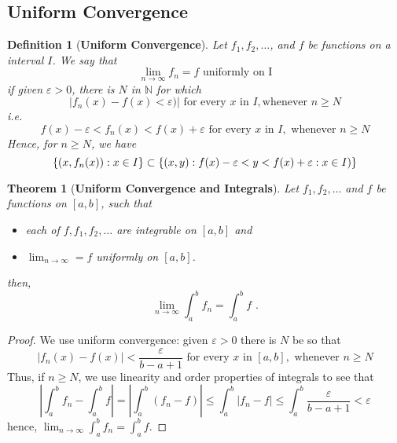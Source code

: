 \documentclass[12pt]{article}
\theoremstyle{plain}
\newtheorem{theorem}{Theorem}[subsection]
\newtheorem{definition}{Definition}[subsection]
\newcommand{\abs}[1]{\left| #1 \right|}
\newcommand{\mN}{{\mathbb{N}}}
\newcommand{\ep}{\varepsilon}
\begin{document}
\subsection{Uniform Convergence}
\begin{definition}[\textbf{Uniform Convergence}]
	Let $f_1, f_2, \ldots$, and $f$ be functions on a interval $I$. We say that
	\[
		\lim_{n\to\infty} f_n = f \text{ uniformly on I} 
	\]
	if given $\ep > 0$, there is $N$ in $\mN$ for which 
	\[
		\abs{f_n(x) - f(x) < \ep)} \text{ for every } x \text{ in } I, 
		\text{whenever } n \geq N
	\]
	i.e.
	\[
		f(x) - \ep < f_n(x) < f(x) + \ep \text{ for every } x \text{ in }
		I, \text{ whenever } n \geq N
	\]
	Hence, for $n\geq N$, we have
	\[
		\{(x , f_n(x)) : x \in I\} 
		\subset 
		\{(x, y) : f(x) - \ep < y < f(x) + \ep : x \in I)\}
		\\
	\]
\end{definition}

\begin{theorem}[\textbf{Uniform Convergence and Integrals}]
	Let $f_1, f_2, \ldots$ and $f$ be functions on $[a, b]$, such that
	\begin{itemize}
		\item each of $f, f_1, f_2, \ldots$ are integrable on $[a,b]$ and
		\item $\lim_{n\to\infty} = f$ uniformly on $[a,b]$.
	\end{itemize}
	then, 
	\[
		\lim_{n\to\infty} \int_a^b f_n = \int_a^b f \,\, .
	\]
\end{theorem}
\begin{proof}
	We use uniform convergence: given $\ep > 0$ there is $N$ be so that
	\[
		\abs{f_n (x) - f(x)} < \frac{\ep}{b-a+1} \text{ for every } x 
		\text{ in } [a, b], \text{ whenever } n \geq N
	\]
	Thus, if $n \geq N$, we use linearity and order properties of integrals to 
	see that 
	\[
		\abs{\int_a^b f_n - \int_a^b f} = \abs{\int_a^b (f_n - f)}
		\leq \int_a^b \abs{f_n - f} \leq \int_a^b \frac{\ep}{b-a+1} < \ep
	\]
	hence, $\lim_{n\to\infty} \int_a^b f_n = \int_a^b f$.
\end{proof}
\end{document}
